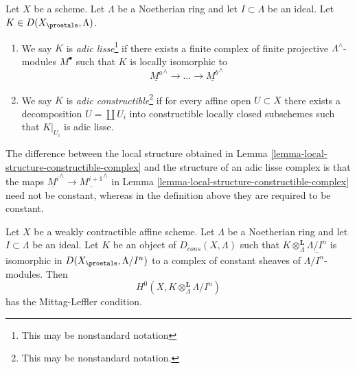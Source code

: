 \begin{definition}
\label{definition-adic-constructible}
Let $X$ be a scheme. Let $\Lambda$ be a Noetherian ring and let
$I \subset \Lambda$ be an ideal. Let $K \in D(X_\proetale, \Lambda)$.
\begin{enumerate}
\item We say $K$ is {\it adic lisse}\footnote{This may be
nonstandard notation} if there exists a finite complex of finite
projective $\Lambda^\wedge$-modules $M^\bullet$ such that
$K$ is locally isomorphic to
$$
\underline{M^a}^\wedge \to \ldots \to \underline{M^b}^\wedge
$$
\item We say $K$ is {\it adic constructible}\footnote{This may be
nonstandard notation.} if for every affine open $U \subset X$
there exists a decomposition $U = \coprod U_i$ into
constructible locally closed subschemes such that $K|_{U_i}$
is adic lisse.
\end{enumerate}
\end{definition}

\noindent
The difference between the local structure obtained in
Lemma \ref{lemma-local-structure-constructible-complex}
and the structure of an adic lisse complex is that
the maps $\underline{M^i}^\wedge \to \underline{M^{i + 1}}^\wedge$ in 
Lemma \ref{lemma-local-structure-constructible-complex}
need not be constant, whereas in the definition above they
are required to be constant.

\begin{lemma}
\label{lemma-weakly-contractible-locally-constant-ML}
Let $X$ be a weakly contractible affine scheme. Let $\Lambda$ be a Noetherian
ring and let $I \subset \Lambda$ be an ideal. Let $K$ be an object of
$D_{cons}(X, \Lambda)$ such that
$K \otimes_\Lambda^\mathbf{L} \underline{\Lambda/I^n}$
is isomorphic in $D(X_\proetale, \Lambda/I^n)$ to a
complex of constant sheaves of $\Lambda/I^n$-modules. Then
$$
H^0(X, K \otimes_\Lambda^\mathbf{L} \Lambda/I^n)
$$
has the Mittag-Leffler condition.
\end{lemma}

